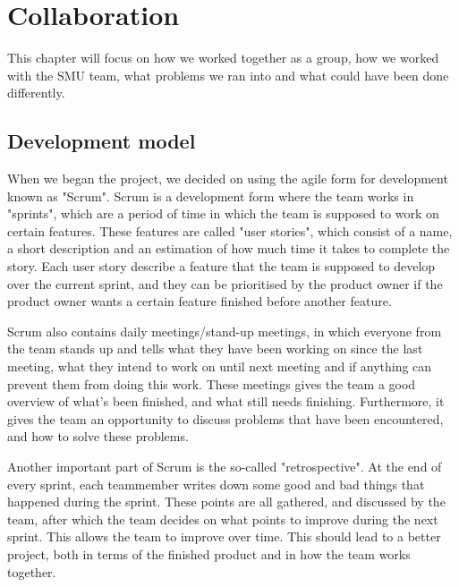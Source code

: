 \chapter{Collaboration}
\label{Collaboration}
This chapter will focus on how we worked together as a group, how we worked with the SMU team, what problems we ran into and what could have been done differently.

\section{Development model}
\label{Collaboration_Development}
When we began the project, we decided on using the agile form for development known as "Scrum". Scrum is a development form where the team works in "sprints", which are a period of time in which the team is supposed to work on certain features. These features are called "user stories", which consist of a name, a short description and an estimation of how much time it takes to complete the story. Each user story describe a feature that the team is supposed to develop over the current sprint, and they can be prioritised by the product owner if the product owner wants a certain feature finished before another feature.

Scrum also contains daily meetings/stand-up meetings, in which everyone from the team stands up and tells what they have been working on since the last meeting, what they intend to work on until next meeting and if anything can prevent them from doing this work. These meetings gives the team a good overview of what's been finished, and what still needs finishing. Furthermore, it gives the team an opportunity to discuss problems that have been encountered, and how to solve these problems.

Another important part of Scrum is the so-called "retrospective". At the end of every sprint, each teammember writes down some good and bad things that happened during the sprint. These points are all gathered, and discussed by the team, after which the team decides on what points to improve during the next sprint. This allows the team to improve over time. This should lead to a better project, both in terms of the finished product and in how the team works together.

